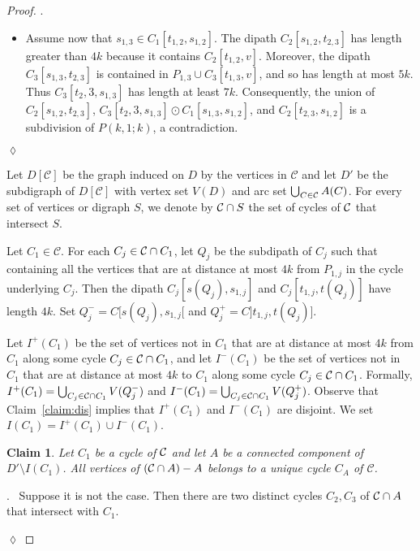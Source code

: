 \documentclass[utf8,10pt]{article}
\theoremstyle{plain}
\newtheorem{claim}{Claim}[theorem]
\theoremstyle{definition}
\theoremstyle{remark}
\newenvironment{subproof}{\par\noindent {\it Subproof}.\ }{\hfill$\lozenge$\par\vspace{11pt}}
\begin{document}
\begin{proof}
\begin{subproof}
\begin{itemize}
	\item Assume now that $s_{1,3}\in C_1[t_{1,2},s_{1,2}]$. The dipath  $C_2[s_{1,2}, t_{2,3}]$ has length greater than $4k$ because it contains $C_2[t_{1,2},v]$. Moreover, the dipath $C_3[s_{1,3}, t_{2,3}]$ is contained in $P_{1,3}\cup C_3[t_{1,3},v]$, and so has length at most $5k$.
	Thus $C_3[t_2,3, s_{1,3}]$ has length at least $7k$.
	 Consequently, the union of $C_2[s_{1,2}, t_{2,3}]$, $C_3[t_2,3, s_{1,3}]\odot C_1[s_{1,3}, s_{1,2}]$, and $C_2[t_{2,3}, s_{1,2}]$ is a subdivision of $P(k,1;k)$, a contradiction.
\end{itemize}
\end{subproof}
 
 
 
 
 
 
 Let $D[\mathcal{C}]$ be the graph induced on $D$ by the vertices in $\mathcal{C}$ and let $D'$ be the subdigraph of $D[\mathcal{C}]$ with vertex set $V(D)$ and arc set  $\bigcup_{C\in {\cal C}} A(C)$.
For every set of vertices or digraph $S$, we denote by ${\cal C}\cap S$ the set of cycles of ${\cal C}$ that intersect $S$. 



Let $C_1\in \mathcal{C}$.
For each $C_j\in {\cal C} \cap C_1$, let $Q_j$ be the subdipath of $C_j$ such that
containing all the vertices that are at distance at most $4k$ from $P_{1,j}$ in the cycle underlying $C_j$.
Then the dipath $C_j[s(Q_j), s_{1,j}]$ and  $C_j[t_{1,j},t (Q_j)]$ have length $4k$.
Set $Q^-_j=C[s(Q_j), s_{1,j}[$ and $Q^+_j=C]t_{1,j}, t(Q_j)]$.

Let $I^+(C_1)$ be the set of vertices not in $C_1$ that are at distance at most $4k$
from $C_1$ along some cycle $C_j\in {\cal C}\cap C_1$, and let $I^-(C_1)$ be the set of vertices not in $C_1$ that are at distance at most $4k$ to $C_1$ along some cycle $C_j\in {\cal C}\cap C_1$.
Formally, $I^+(C_1) = \bigcup_{C_j\in {\cal C}\cap C_1} V(Q^-_j)$ and $I^-(C_1) = \bigcup_{C_j\in {\cal C}\cap C_1} V(Q^+_j)$.
Observe that Claim~\ref{claim:dis} implies that $I^+(C_1)$ and $I^-(C_1)$ are disjoint. We set $I(C_1)=I^+(C_1)\cup I^-(C_1)$.




\begin{claim}\label{claim:A}
Let $C_1$ be a cycle of ${\cal C}$ and let $A$ be a connected component of $D'\setminus I(C_1)$.
All vertices of $({\cal C}\cap A)  - A$ belongs to a unique cycle $C_A$ of $\mathcal{C}$.
\end{claim}

\begin{subproof}
Suppose it is not the case. Then there are two distinct cycles $C_2, C_3$ of ${\cal C}\cap A$ that intersect with $C_1$.


\end{subproof}
\end{proof}
\end{document}
